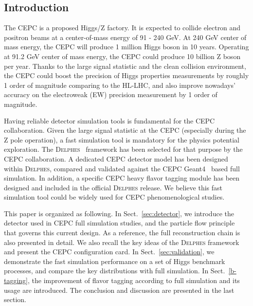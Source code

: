 \documentclass[a4paper,10pt,twoside]{cpc-hepnp}
\begin{document}
%

\begin{multicols}{2}


\section{Introduction}\label{sec:intro}

The CEPC\cite{ref:cepc_det, ref:cepc_acc} is a proposed Higgs/Z factory. 
It is expected to collide electron and positron beams at a center-of-mass energy of 91 - 240 GeV.
At 240 GeV center of mass energy, the CEPC will produce 1 million Higgs boson in 10 years.
Operating at 91.2 GeV center of mass energy, the CEPC could produce 10 billion Z boson per year.
Thanks to the large signal statistic and the clean collision environment, the CEPC could boost the precision of Higgs properties measurements by roughly 1 order of magnitude comparing to the HL-LHC, 
and also improve nowadays' accuracy on the electroweak (EW) precision measurement by 1 order of magnitude\cite{ref:cepc_det}. 

Having reliable detector simulation tools is fundamental for the CEPC collaboration. 
Given the large signal statistic at the CEPC (especially during the Z pole operation), 
a fast simulation tool is mandatory for the physics potential exploration. %
The {\textsc{Delphes}~}\cite{ref:delphes} framework has been selected for that purpose by the CEPC collaboration. 
A dedicated CEPC detector model has been designed within {\textsc{Delphes}}, compared and validated against the CEPC Geant4~\cite{ref:geant4} based full simulation. 
In addition, a specific CEPC heavy flavor tagging module has been designed and included in the official {\textsc{Delphes}} release. 
We believe this fast simulation tool could be widely used for CEPC phenomenological studies. 

This paper is organized as following.  
In Sect.{~\ref{sec:detector}}, we introduce the detector used in CEPC full simulation studies, 
and the particle flow principle that governs this current design. 
As a reference, the full reconstruction chain is also presented in detail. 
We also recall the key ideas of the {\textsc{Delphes}} framework and present the CEPC configuration card. 
In Sect.{~\ref{sec:validation}}, we demonstrate the fast simulation performance on a set of Higgs benchmark processes, and compare the key distributions with full simulation.
In Sect.{~\ref{b-tagging}}, the improvement of flavor tagging according to full simulation and its usage are introduced.
The conclusion and discussion are presented in the last section. 


\end{multicols}
\end{document}
